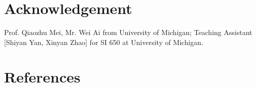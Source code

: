 \documentclass[letterpaper,10pt]{article}
\begin{document}
\begin{multicols}{2}
    \section{Acknowledgement}

    Prof. Qiaozhu Mei, Mr. Wei Ai from University of Michigan;
    Teaching Assistant [Shiyan Yan, Xinyan Zhao] for SI 650 at University of Michigan.

    \section*{References}





\end{multicols}
\end{document}
